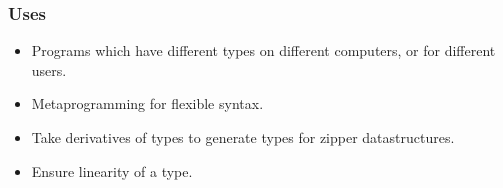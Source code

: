 
\begin{frame}
\frametitle{Uses}
\begin{itemize}

\item Programs which have different types on different computers, or for different users.
\item Metaprogramming for flexible syntax.
\item Take derivatives of types to generate types for zipper datastructures.
\item Ensure linearity of a type.

\end{itemize}

\end{frame}


